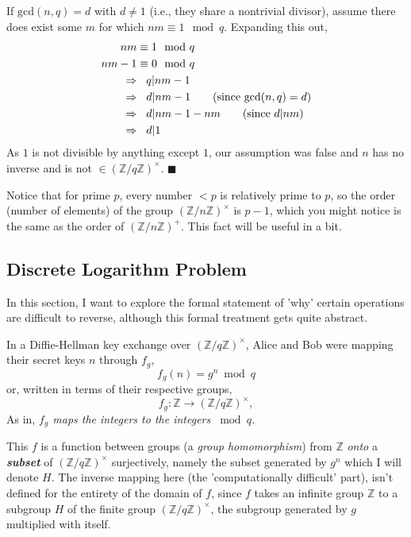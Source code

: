 \documentclass[11pt, a4paper]{report}
\newcommand{\qed}{\hfill $\blacksquare$}
\newcommand{\integers}{\mathbb{Z}}
\begin{document}
	If $\mathrm{gcd}(n,q) = d$ with $d \neq 1$ (i.e., they share a nontrivial divisor), assume there does exist some $m$ for which $nm \equiv 1 \mod q$. Expanding this out,
\begin{align*}
	nm &\equiv 1 \mod q\\
	nm - 1 &\equiv 0 \mod q\\
	\Rightarrow &\hspace*{0.3cm} q | nm-1\\
	\Rightarrow &\hspace*{0.3cm} d | nm-1 \tag{since $\mathrm{gcd}(n,q) = d$}\\
	\Rightarrow &\hspace*{0.3cm} d | nm-1 -nm \tag{since $d|nm$}\\
	\Rightarrow &\hspace*{0.3cm} d | 1
\end{align*}
As $1$ is not divisible by anything except $1$, our assumption was false and $n$ has no inverse and is not $\in (\integers / q \integers)^{\times}$.\autocite[19]{koblitz} 
\qed

Notice that for prime $p$, every number $< p$ is relatively prime to $p$, so the order (number of elements) of the group $(\integers / n \integers)^{\times}$ is $p-1$, which you might notice is the same as the order of $(\integers / n \integers)^{+}$. This fact will be useful in a bit.


\subsection{Discrete Logarithm Problem}

In this section, I want to explore the formal statement of 'why' certain operations are difficult to reverse, although this formal treatment gets quite abstract. 

In a Diffie-Hellman key exchange over $(\integers / q \integers)^{\times}$, Alice and Bob were mapping their secret keys $n$ through $f_g$,
\[ f_g(n) = g^n \bmod q \]
or, written in terms of their respective groups,
\[ f_g: \integers \rightarrow (\integers / q \integers)^{\times}, \]
As in, \textit{$f_g$ maps the integers to the integers $\bmod q$.}

This $f$ is a function between groups (a \textit{group homomorphism}) from $\integers$ \textit{onto} a \textit{\textbf{subset}} of $(\integers / q \integers)^{\times}$ surjectively, namely the subset generated by $g^n$ which I will denote $H$. The inverse mapping here (the 'computationally difficult' part), isn't defined for the entirety of the domain of $f$, since $f$ takes an infinite group $\integers$ to a subgroup $H$ of the finite group $(\integers / q \integers)^{\times}$, the subgroup generated by $g$ multiplied with itself.  
\end{document}
